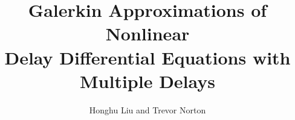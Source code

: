 \documentclass{./styles/siamart1116} %
\title{Galerkin Approximations of Nonlinear \\ Delay Differential Equations with Multiple Delays}
\author{Honghu Liu and Trevor Norton}
\date{}
\numberwithin{equation}{section}
\begin{document}
\maketitle

\begin{abstract}
\end{abstract}









\appendix




\end{document}

